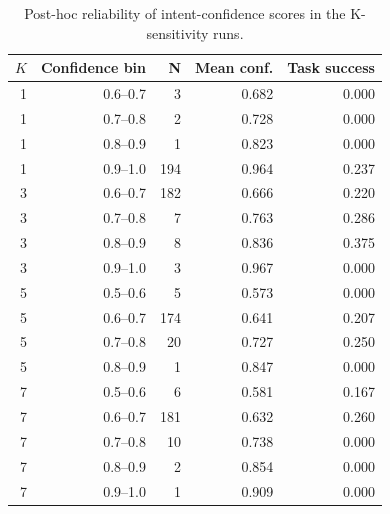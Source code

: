 \begin{table}[t]
\centering
\caption{Post-hoc reliability of intent-confidence scores in the K-sensitivity runs.}
\label{tab:confidence-reliability}
\begin{tabular}{rrrrr}
\toprule
$K$ & Confidence bin & N & Mean conf. & Task success \\
\midrule
1 & 0.6--0.7 & 3 & 0.682 & 0.000 \\
1 & 0.7--0.8 & 2 & 0.728 & 0.000 \\
1 & 0.8--0.9 & 1 & 0.823 & 0.000 \\
1 & 0.9--1.0 & 194 & 0.964 & 0.237 \\
3 & 0.6--0.7 & 182 & 0.666 & 0.220 \\
3 & 0.7--0.8 & 7 & 0.763 & 0.286 \\
3 & 0.8--0.9 & 8 & 0.836 & 0.375 \\
3 & 0.9--1.0 & 3 & 0.967 & 0.000 \\
5 & 0.5--0.6 & 5 & 0.573 & 0.000 \\
5 & 0.6--0.7 & 174 & 0.641 & 0.207 \\
5 & 0.7--0.8 & 20 & 0.727 & 0.250 \\
5 & 0.8--0.9 & 1 & 0.847 & 0.000 \\
7 & 0.5--0.6 & 6 & 0.581 & 0.167 \\
7 & 0.6--0.7 & 181 & 0.632 & 0.260 \\
7 & 0.7--0.8 & 10 & 0.738 & 0.000 \\
7 & 0.8--0.9 & 2 & 0.854 & 0.000 \\
7 & 0.9--1.0 & 1 & 0.909 & 0.000 \\
\bottomrule
\end{tabular}
\end{table}
